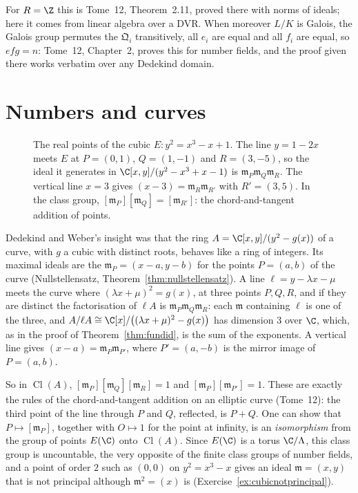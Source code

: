 For $R=\Z$ this is Tome~12, Theorem~2.11, proved there with norms of ideals; here it comes from linear algebra over a DVR. When moreover $L/K$ is Galois, the Galois group permutes the $\mathfrak Q_i$ transitively, all $e_i$ are
equal and all $f_i$ are equal, so $efg=n$: Tome~12, Chapter~2, proves this for number fields, and the proof given there works verbatim over any Dedekind domain.

\section{Numbers and curves}

\begin{figure}[ht]
\centering
{}
\caption{The real points of the cubic $E\colon y^2=x^3-x+1$. The line $y=1-2x$ meets $E$ at $P=(0,1)$, $Q=(1,-1)$ and $R=(3,-5)$, so the ideal it generates in $\C[x,y]/(y^2-x^3+x-1)$ is $\mathfrak m_P\mathfrak m_Q\mathfrak m_R$.
The vertical line $x=3$ gives $(x-3)=\mathfrak m_R\mathfrak m_{R'}$ with $R'=(3,5)$. In the class group, $[\mathfrak m_P][\mathfrak m_Q]=[\mathfrak m_{R'}]$: the chord-and-tangent addition of points.}
\label{fig:cubicclass}
\end{figure}

Dedekind and Weber's insight was that the ring $A=\C[x,y]/(y^2-g(x))$ of a curve, with $g$ a cubic with distinct roots, behaves like a ring of integers. Its maximal ideals are the $\mathfrak m_P=(x-a,y-b)$ for the points
$P=(a,b)$ of the curve (Nullstellensatz, Theorem~\ref{thm:nullstellensatz}). A line $\ell=y-\lambda x-\mu$ meets the curve where $(\lambda x+\mu)^2=g(x)$, at three points $P,Q,R$, and if they are distinct the factorisation of
$\ell A$ is $\mathfrak m_P\mathfrak m_Q\mathfrak m_R$: each $\mathfrak m$ containing $\ell$ is one of the three, and $A/\ell A\cong\C[x]/\bigl((\lambda x+\mu)^2-g(x)\bigr)$ has dimension $3$ over $\C$, which, as in the proof of
Theorem~\ref{thm:fundid}, is the sum of the exponents. A vertical line gives $(x-a)=\mathfrak m_P\mathfrak m_{P'}$, where $P'=(a,-b)$ is the mirror image of $P=(a,b)$.

So in $\operatorname{Cl}(A)$, $[\mathfrak m_P][\mathfrak m_Q][\mathfrak m_R]=1$ and $[\mathfrak m_P][\mathfrak m_{P'}]=1$. These are exactly the rules of the chord-and-tangent addition on an elliptic curve (Tome~12): the
third point of the line through $P$ and $Q$, reflected, is $P+Q$. One can show that $P\mapsto[\mathfrak m_P]$, together with $O\mapsto1$ for the point at infinity, is an \emph{isomorphism} from the group of points $E(\C)$ onto
$\operatorname{Cl}(A)$. Since $E(\C)$ is a torus $\C/\Lambda$, this class group is uncountable, the very opposite of the finite class groups of number fields, and a point of order $2$ such as $(0,0)$ on $y^2=x^3-x$ gives an
ideal $\mathfrak m=(x,y)$ that is not principal although $\mathfrak m^2=(x)$ is (Exercise~\ref{ex:cubicnotprincipal}).


